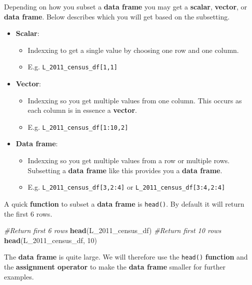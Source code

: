 \documentclass[]{book}
\newenvironment{Shaded}{\begin{snugshade}}{\end{snugshade}}
\newcommand{\KeywordTok}[1]{\textcolor[rgb]{0.13,0.29,0.53}{\textbf{#1}}}
\newcommand{\DecValTok}[1]{\textcolor[rgb]{0.00,0.00,0.81}{#1}}
\newcommand{\CommentTok}[1]{\textcolor[rgb]{0.56,0.35,0.01}{\textit{#1}}}
\newcommand{\NormalTok}[1]{#1}
\providecommand{\tightlist}{%
  \setlength{\itemsep}{0pt}\setlength{\parskip}{0pt}}
\begin{document}
Depending on how you subset a \textbf{data frame} you may get a
\textbf{scalar}, \textbf{vector}, or \textbf{data frame}. Below
describes which you will get based on the subsetting.

\begin{itemize}
\tightlist
\item
  \textbf{Scalar}:

  \begin{itemize}
  \tightlist
  \item
    Indexxing to get a single value by choosing one row and one column.
  \item
    E.g. \texttt{L\_2011\_census\_df{[}1,1{]}}
  \end{itemize}
\item
  \textbf{Vector}:

  \begin{itemize}
  \tightlist
  \item
    Indexxing so you get multiple values from one column. This occurs as
    each column is in essence a \textbf{vector}.
  \item
    E.g. \texttt{L\_2011\_census\_df{[}1:10,2{]}}
  \end{itemize}
\item
  \textbf{Data frame}:

  \begin{itemize}
  \tightlist
  \item
    Indexxing so you get multiple values from a row or multiple rows.
    Subsetting a \textbf{data frame} like this provides you a
    \textbf{data frame}.
  \item
    E.g. \texttt{L\_2011\_census\_df{[}3,2:4{]}} or
    \texttt{L\_2011\_census\_df{[}3:4,2:4{]}}
  \end{itemize}
\end{itemize}

A quick \textbf{function} to subset a \textbf{data frame} is
\texttt{head()}. By default it will return the first 6 rows.

\begin{Shaded}
\begin{Highlighting}[]
\CommentTok{#Return first 6 rows}
\KeywordTok{head}\NormalTok{(L_2011_census_df)}
\CommentTok{#Return first 10 rows}
\KeywordTok{head}\NormalTok{(L_2011_census_df, }\DecValTok{10}\NormalTok{)}
\end{Highlighting}
\end{Shaded}

The \textbf{data frame} is quite large. We will therefore use the
\texttt{head()} \textbf{function} and the \textbf{assignment operator}
to make the \textbf{data frame} smaller for further examples.
\end{document}
